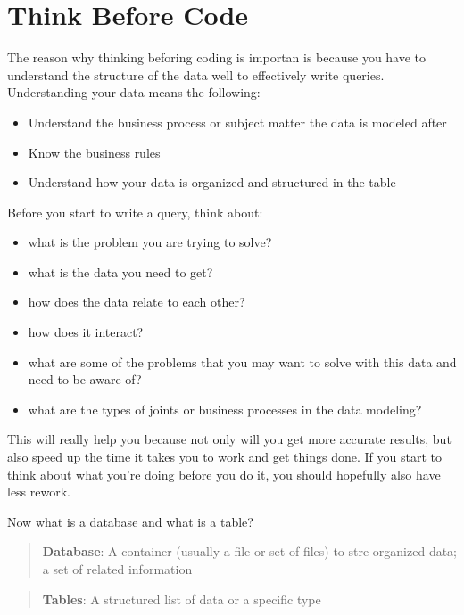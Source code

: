 \documentclass[]{book}
\providecommand{\tightlist}{%
  \setlength{\itemsep}{0pt}\setlength{\parskip}{0pt}}
\theoremstyle{definition}
\theoremstyle{definition}
\theoremstyle{remark}
\begin{document}
\section{Think Before Code}\label{think-before-code}

The reason why thinking beforing coding is importan is because you have
to understand the structure of the data well to effectively write
queries. Understanding your data means the following:

\begin{itemize}
\tightlist
\item
  Understand the business process or subject matter the data is modeled
  after
\item
  Know the business rules
\item
  Understand how your data is organized and structured in the table
\end{itemize}

Before you start to write a query, think about:

\begin{itemize}
\tightlist
\item
  what is the problem you are trying to solve?
\item
  what is the data you need to get?
\item
  how does the data relate to each other?
\item
  how does it interact?
\item
  what are some of the problems that you may want to solve with this
  data and need to be aware of?
\item
  what are the types of joints or business processes in the data
  modeling?
\end{itemize}

This will really help you because not only will you get more accurate
results, but also speed up the time it takes you to work and get things
done. If you start to think about what you're doing before you do it,
you should hopefully also have less rework.

Now what is a database and what is a table?

\begin{quote}
\textbf{Database}: A container (usually a file or set of files) to stre
organized data; a set of related information
\end{quote}

\begin{quote}
\textbf{Tables}: A structured list of data or a specific type
\end{quote}
\end{document}
